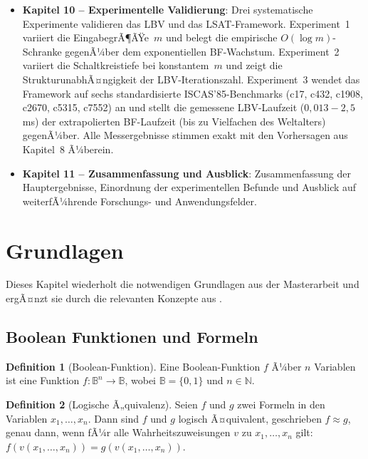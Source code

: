 ﻿\documentclass[a4paper,12pt]{article}
\theoremstyle{definition}
\newtheorem{definition}{Definition}
\begin{document}
\begin{itemize}
    \item[-] \textbf{Kapitel 10 -- Experimentelle Validierung}: Drei systematische
      Experimente validieren das LBV und das LSAT-Framework.  Experiment~1 variiert
      die EingabegrÃ¶ÃŸe~$m$ und belegt die empirische $O(\log m)$-Schranke gegenÃ¼ber
      dem exponentiellen BF-Wachstum.  Experiment~2 variiert die Schaltkreistiefe bei
      konstantem~$m$ und zeigt die StrukturunabhÃ¤ngigkeit der
      LBV-Iterationszahl.  Experiment~3 wendet das Framework auf sechs standardisierte
      ISCAS'85-Benchmarks (c17, c432, c1908, c2670, c5315, c7552) an und stellt die
      gemessene LBV-Laufzeit ($0{,}013{-}2{,}5$\,ms) der extrapolierten BF-Laufzeit
      (bis zu Vielfachen des Weltalters) gegenÃ¼ber.  Alle Messergebnisse stimmen
      exakt mit den Vorhersagen aus Kapitel~8 Ã¼berein.

    \item[-] \textbf{Kapitel 11 -- Zusammenfassung und Ausblick}: Zusammenfassung der
      Hauptergebnisse, Einordnung der experimentellen Befunde und Ausblick auf
      weiterfÃ¼hrende Forschungs- und Anwendungsfelder.
\end{itemize}

\section{Grundlagen}

Dieses Kapitel wiederholt die notwendigen Grundlagen aus der Masterarbeit \cite{Epp13} und ergÃ¤nzt sie durch die relevanten Konzepte aus \cite{Epp26, Epp26}.

\subsection{Boolean Funktionen und Formeln}

\begin{definition}[Boolean-Funktion]
    Eine Boolean-Funktion $f$ Ã¼ber $n$ Variablen ist eine Funktion $f: \mathbb{B}^n \to \mathbb{B}$, wobei $\mathbb{B} = \{0, 1\}$ und $n \in \mathbb{N}$.
\end{definition}

\begin{definition}[Logische Ã„quivalenz]
    Seien $f$ und $g$ zwei Formeln in den Variablen $x_1, \ldots, x_n$. Dann sind $f$ und $g$ logisch Ã¤quivalent, geschrieben $f \approx g$, genau dann, wenn fÃ¼r alle Wahrheitszuweisungen $v$ zu $x_1, \ldots, x_n$ gilt: $f(v(x_1, \ldots, x_n)) = g(v(x_1, \ldots, x_n))$.
\end{definition}
\end{document}

